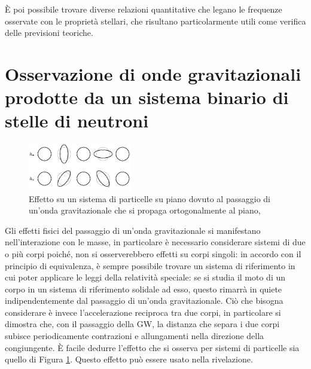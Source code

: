 È poi possibile trovare diverse relazioni quantitative che legano le frequenze osservate con le proprietà stellari, che risultano particolarmente utili come verifica delle previsioni teoriche.
\section[Osservazioni di onde gravtazionali]{Osservazione di onde gravitazionali prodotte da un sistema binario di stelle di neutroni}
\label{chapter:gw170817}
\begin{figure}
	\vspace{-10pt}
	\begin{center}
		\includegraphics[width=0.4\textwidth]{figures/Capitolo_1/gw_effect.png}
	\end{center}
	\vspace{-5pt}
	\caption{Effetto su un sistema di particelle su piano dovuto al passaggio di un'onda gravitazionale che si propaga ortogonalmente al piano, \cite{universe3030059}}
	\label{fig:gweffect}
	\vspace{-10pt}
\end{figure}
Gli effetti fisici del passaggio di un'onda gravitazionale si manifestano nell'interazione con le masse, in particolare è necessario considerare sistemi di due o più corpi poiché, non si osserverebbero effetti su corpi singoli: in accordo con il principio di equivalenza, è sempre possibile trovare un sistema di riferimento in cui poter applicare le leggi della relatività speciale: se si studia il moto di un corpo in un sistema di riferimento solidale ad esso, questo rimarrà in quiete indipendentemente dal passaggio di un'onda gravitazionale. Ciò che bisogna considerare è invece l'accelerazione reciproca tra due corpi, in particolare si dimostra che, con il passaggio della GW, la distanza che separa i due corpi subisce periodicamente contrazioni e allungamenti nella direzione della congiungente.
È facile dedurre l'effetto che si osserva per sistemi di particelle sia quello di Figura \ref{fig:gweffect}. Questo effetto può essere usato nella rivelazione.

